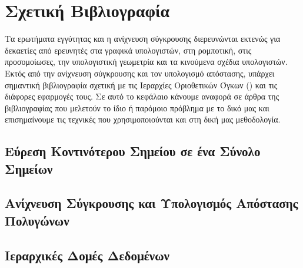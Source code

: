 \chapter{Σχετική Βιβλιογραφία}
\label{ch:related_work}
Τα ερωτήματα εγγύτητας και η ανίχνευση σύγκρουσης διερευνώνται 
εκτενώς για δεκαετίες από ερευνητές στα γραφικά υπολογιστών, στη ρομποτική,
στις προσομοίωσες, την υπολογιστική γεωμετρία και τα κινούμενα σχέδια 
υπολογιστών. 
Εκτός από την ανίχνευση σύγκρουσης και τον υπολογισμό απόστασης, υπάρχει
σημαντική βιβλιογραφία σχετική με τις Ιεραρχίες Οριοθετικών Όγκων 
() και τις διάφορες εφαρμογές τους. 
Σε αυτό το κεφάλαιο κάνουμε αναφορά σε άρθρα της βιβλιογραφίας 
που μελετούν το ίδιο ή παρόμοιο πρόβλημα με το δικό μας
και επισημαίνουμε τις τεχνικές που χρησιμοποιούνται 
και στη δική μας μεθοδολογία.

\section{Εύρεση Κοντινότερου Σημείου σε ένα Σύνολο Σημείων}

\section{Ανίχνευση Σύγκρουσης και Υπολογισμός Απόστασης Πολυγώνων}

\section{Ιεραρχικές Δομές Δεδομένων}
